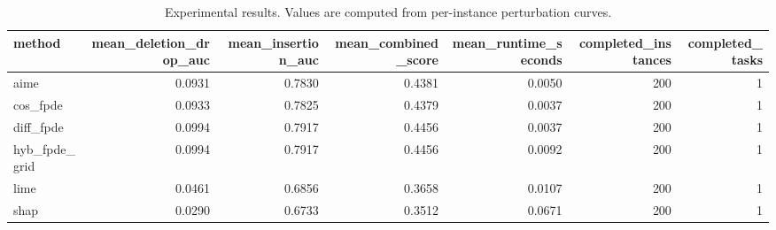 \begin{table}[t]
\caption{Experimental results. Values are computed from per-instance perturbation curves.}
\label{tab:main_results_computed}
\centering
\begin{tabular}{lrrrrrr}
\toprule
method & mean\_deletion\_drop\_auc & mean\_insertion\_auc & mean\_combined\_score & mean\_runtime\_seconds & completed\_instances & completed\_tasks \\
\midrule
aime & 0.0931 & 0.7830 & 0.4381 & 0.0050 & 200 & 1 \\
cos\_fpde & 0.0933 & 0.7825 & 0.4379 & 0.0037 & 200 & 1 \\
diff\_fpde & 0.0994 & 0.7917 & 0.4456 & 0.0037 & 200 & 1 \\
hyb\_fpde\_grid & 0.0994 & 0.7917 & 0.4456 & 0.0092 & 200 & 1 \\
lime & 0.0461 & 0.6856 & 0.3658 & 0.0107 & 200 & 1 \\
shap & 0.0290 & 0.6733 & 0.3512 & 0.0671 & 200 & 1 \\
\bottomrule
\end{tabular}

\end{table}
